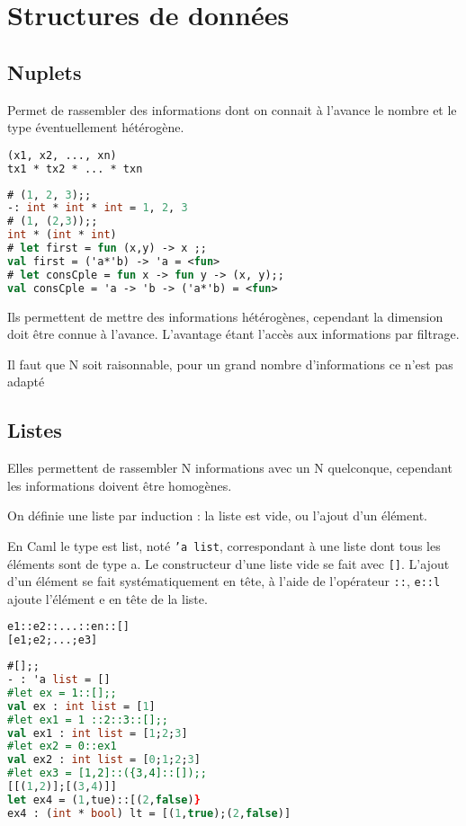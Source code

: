 \chapter{Structures de données}
\section{Nuplets}
Permet de rassembler des informations dont on connait à l'avance le nombre et le type éventuellement hétérogène.
	\begin{lstlisting}[language=Caml, caption=Syntaxe de n-uplets, numbers=none]
(x1, x2, ..., xn)		
tx1 * tx2 * ... * txn
\end{lstlisting}

\begin{exemple}
	\begin{lstlisting}[language=Caml, caption=Exemple n-uplets, numbers=none, framerule=0pt]
# (1, 2, 3);;
-: int * int * int = 1, 2, 3
# (1, (2,3));; 
int * (int * int)
# let first = fun (x,y) -> x ;;
val first = ('a*'b) -> 'a = <fun>
# let consCple = fun x -> fun y -> (x, y);;
val consCple = 'a -> 'b -> ('a*'b) = <fun>
\end{lstlisting}
\end{exemple}

Ils permettent de mettre des informations hétérogènes, cependant la dimension doit être connue à l'avance. L'avantage étant l'accès aux informations
par filtrage.

Il faut que N soit raisonnable, pour un grand nombre d'informations ce n'est pas adapté

\section{Listes}
Elles permettent de rassembler N informations avec un N quelconque, cependant les informations doivent être homogènes.

On définie une liste par induction : la liste est vide, ou l'ajout d'un élément.

En Caml le type est list, noté \texttt{'a list}, correspondant à une liste dont tous les éléments sont de type a. Le constructeur d'une liste vide se
fait avec \texttt{[]}.  L'ajout d'un élément se fait systématiquement en tête, à l'aide de l'opérateur \texttt{::}, \texttt{e::l} ajoute l'élément e en tête de la liste.

	\begin{lstlisting}[language=Caml, numbers=none, framerule=0pt]
e1::e2::...::en::[]	
[e1;e2;...;e3]
	\end{lstlisting}
	\begin{exemple}
	\begin{lstlisting}[language=Caml, caption=Exemple de listes, numbers=none, framerule=0pt]
#[];;
- : 'a list = []
#let ex = 1::[];;
val ex : int list = [1]
#let ex1 = 1 ::2::3::[];;
val ex1 : int list = [1;2;3]
#let ex2 = 0::ex1
val ex2 : int list = [0;1;2;3]
#let ex3 = [1,2]::({3,4]::[]);;
[[(1,2)];[(3,4)]]
let ex4 = (1,tue)::[(2,false)}
ex4 : (int * bool) lt = [(1,true);(2,false)]
	\end{lstlisting}
	\end{exemple}

